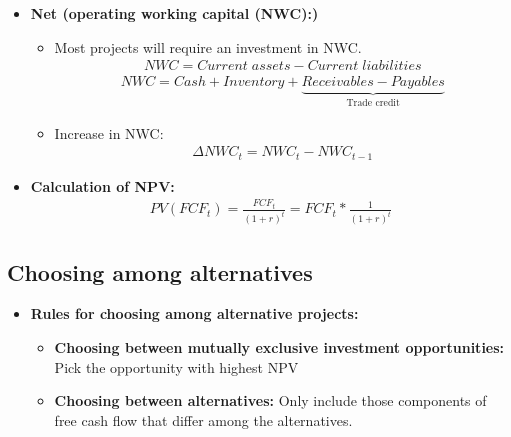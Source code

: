\documentclass[ieeetran]{article}
\begin{document}
\begin{itemize}
\item \textbf{Net (operating working capital (NWC):)}
	\begin{itemize}
	  \item Most projects will require an investment in NWC.
		  \large
		  \begin{equation*}
		  \boxed{
		  \begin{aligned}
		  NWC = Current \; assets - Current \; liabilities
		  \end{aligned}
		  }
		  \end{equation*}
		  \normalsize
		  \large
		  \begin{equation*}
		  \boxed{
		  \begin{aligned}
		  NWC = Cash + Inventory + \underbrace{Receivables - Payables}_\text{Trade credit}
		  \end{aligned}
		  }
		  \end{equation*}
		  \normalsize
\item Increase in NWC:
	\large
	\begin{equation*}
	\boxed{
	\begin{aligned}
	\Delta NWC_t = NWC_t - NWC_{t-1}
	\end{aligned}
	}
	\end{equation*}
	\normalsize		  
	\end{itemize}

\item \textbf{Calculation of NPV:}
	\large
	\begin{equation*}
	\boxed{
	\begin{aligned}
		PV(FCF_t) = \frac{FCF_t}{(1+r)^t} = FCF_t * \frac{1}{(1+r)^t}
	\end{aligned}
	}
	\end{equation*}
	\normalsize
	
\end{itemize}

\subsection{Choosing among alternatives} %
\label{sub:choosing_among_alternatives}
\begin{itemize}
  \item \textbf{Rules for choosing among alternative projects:}
	  \begin{itemize}
	    \item \textbf{Choosing between mutually exclusive investment opportunities:} Pick the opportunity with highest NPV
    \item \textbf{Choosing between alternatives:} Only include those components of free cash flow that differ among the alternatives.
	  \end{itemize}
\end{itemize}
\end{document}
